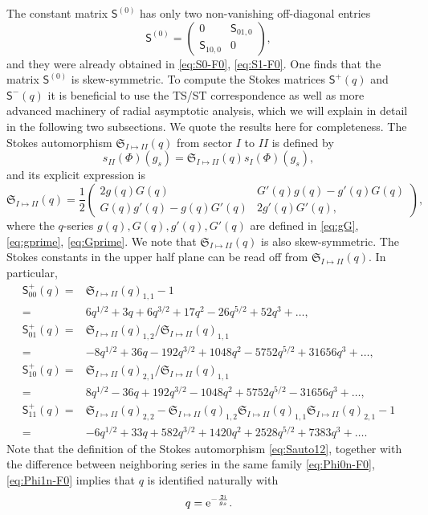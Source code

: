 \documentclass[a4paper,11pt]{article}
\theoremstyle{definition}
\newcommand{\re}{{\rm e}}
\newcommand{\ri}{{\rm i}}
\newcommand{\nn}{\nonumber \\}
\def\mf{\mathfrak}
\def\ms{\mathsf}
\begin{document}
The constant matrix $\ms{S}^{(0)}$ has only two non-vanishing off-diagonal
entries
%
\begin{equation}
  \ms{S}^{(0)} =
  \begin{pmatrix}
    0 & \ms{S}_{01,0}\\
    \ms{S}_{10,0} & 0
  \end{pmatrix},
\end{equation}
%
and they were already obtained in \eqref{eq:S0-F0}, \eqref{eq:S1-F0}.
One finds that the matrix $\ms{S}^{(0)}$ is skew-symmetric.  To
compute the Stokes matrices $\ms{S}^+(q)$ and $\ms{S}^-(q)$ it is
beneficial to use the TS/ST correspondence as well as more advanced
machinery of radial asymptotic analysis, which we will explain in
detail in the following two subsections. We quote the results here for
completeness. The Stokes automorphism $\mf{S}_{I\mapsto II}(q)$ from
sector $I$ to $II$ is defined by
%
\begin{equation}
  s_{II}(\Phi)(g_s) = \mf{S}_{I\mapsto II}(q) s_{I}(\Phi)(g_s),
  \label{eq:Sauto12}
\end{equation}
and its explicit expression is 
%
\begin{equation}
  \mf{S}_{I\mapsto II}(q) = \frac{1}{2}
  \begin{pmatrix}
    2g(q)G(q) & G'(q)g(q) - g'(q)G(q)\\
    G(q)g'(q) - g(q)G'(q) & 2g'(q)G'(q), 
  \end{pmatrix},
  \label{eq:Sp-F0}
\end{equation}
%
where the $q$-series $g(q),G(q),g'(q),G'(q)$ are defined in
\eqref{eq:gG}, \eqref{eq:gprime}, \eqref{eq:Gprime}.  We note that
$\mf{S}_{I\mapsto II}(q)$ is also skew-symmetric. The Stokes constants in the upper half plane
can be read off from $\mf{S}_{I\mapsto II}(q)$. In particular,
%
\begin{subequations}
  \begin{align}
    \ms{S}^+_{00}(q) =
    &\mf{S}_{I\mapsto II}(q)_{1,1}-1\nn =
    &6q^{1/2}+3q+6q^{3/2}+17q^2-26 q^{5/2} + 52 q^3+\ldots,\\
    \ms{S}^+_{01}(q) =
    &\mf{S}_{I\mapsto II}(q)_{1,2}/\mf{S}_{I\mapsto II}(q)_{1,1}\nn =
    &-8q^{1/2}+36q-192q^{3/2}+1048q^2-5752 q^{5/2} + 31656 q^3+\ldots,\\
    \ms{S}^+_{10}(q) =
    &\mf{S}_{I\mapsto II}(q)_{2,1}/\mf{S}_{I\mapsto II}(q)_{1,1}\nn =
    &8q^{1/2}-36q+192q^{3/2}-1048q^2+5752 q^{5/2} - 31656 q^3+\ldots,\\
    \ms{S}^+_{11}(q) =
    &\mf{S}_{I\mapsto II}(q)_{2,2} -
      \mf{S}_{I\mapsto II}(q)_{1,2}
      \mf{S}_{I\mapsto  II}(q)_{1,1}\mf{S}_{I\mapsto II}(q)_{2,1}-1\nn =
    &-6q^{1/2}+33q+582q^{3/2}+1420q^2+2528 q^{5/2} + 7383 q^3+\ldots.
  \end{align}
\end{subequations}
Note that the definition of the Stokes automorphism \eqref{eq:Sauto12}, 
together with the difference between neighboring series in the same
family \eqref{eq:Phi0n-F0}, \eqref{eq:Phi1n-F0} implies that $q$ is identified naturally with 
%
\begin{equation}
  q = \re^{-\frac{2\ri}{g_s}}.
  \label{eq:q-gs}
\end{equation}
\end{document}

